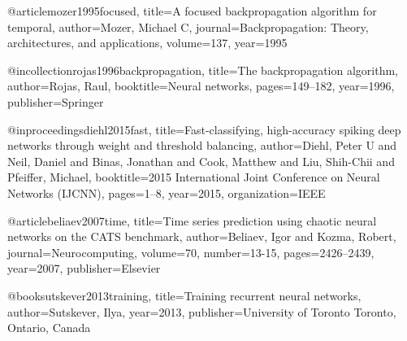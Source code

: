 @article{mozer1995focused,
  title={A focused backpropagation algorithm for temporal},
  author={Mozer, Michael C},
  journal={Backpropagation: Theory, architectures, and applications},
  volume={137},
  year={1995}
}

@incollection{rojas1996backpropagation,
  title={The backpropagation algorithm},
  author={Rojas, Raul},
  booktitle={Neural networks},
  pages={149--182},
  year={1996},
  publisher={Springer}
}

@inproceedings{diehl2015fast,
  title={Fast-classifying, high-accuracy spiking deep networks through weight and threshold balancing},
  author={Diehl, Peter U and Neil, Daniel and Binas, Jonathan and Cook, Matthew and Liu, Shih-Chii and Pfeiffer, Michael},
  booktitle={2015 International Joint Conference on Neural Networks (IJCNN)},
  pages={1--8},
  year={2015},
  organization={IEEE}
}

@article{beliaev2007time,
  title={Time series prediction using chaotic neural networks on the CATS benchmark},
  author={Beliaev, Igor and Kozma, Robert},
  journal={Neurocomputing},
  volume={70},
  number={13-15},
  pages={2426--2439},
  year={2007},
  publisher={Elsevier}
}


@book{sutskever2013training,
  title={Training recurrent neural networks},
  author={Sutskever, Ilya},
  year={2013},
  publisher={University of Toronto Toronto, Ontario, Canada}
}